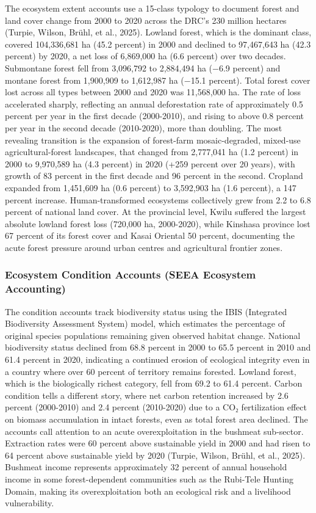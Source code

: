 \documentclass[
  letterpaper,
  DIV=11,
  numbers=noendperiod]{scrartcl}
\begin{document}
The ecosystem extent accounts use a 15-class typology to document forest
and land cover change from 2000 to 2020 across the DRC's 230 million
hectares (Turpie, Wilson, Brühl, et al., 2025). Lowland forest, which is
the dominant class, covered 104,336,681 ha (45.2 percent) in 2000 and
declined to 97,467,643 ha (42.3 percent) by 2020, a net loss of
6,869,000 ha (6.6 percent) over two decades. Submontane forest fell from
3,096,792 to 2,884,494 ha (−6.9 percent) and montane forest from
1,900,909 to 1,612,987 ha (−15.1 percent). Total forest cover lost
across all types between 2000 and 2020 was 11,568,000 ha. The rate of
loss accelerated sharply, reflecting an annual deforestation rate of
approximately 0.5 percent per year in the first decade (2000-2010), and
rising to above 0.8 percent per year in the second decade (2010-2020),
more than doubling. The most revealing transition is the expansion of
forest-farm mosaic-degraded, mixed-use agricultural-forest landscapes,
that changed from 2,777,041 ha (1.2 percent) in 2000 to 9,970,589 ha
(4.3 percent) in 2020 (+259 percent over 20 years), with growth of 83
percent in the first decade and 96 percent in the second. Cropland
expanded from 1,451,609 ha (0.6 percent) to 3,592,903 ha (1.6 percent),
a 147 percent increase. Human-transformed ecosystems collectively grew
from 2.2 to 6.8 percent of national land cover. At the provincial level,
Kwilu suffered the largest absolute lowland forest loss (720,000 ha,
2000-2020), while Kinshasa province lost 67 percent of its forest cover
and Kasai Oriental 50 percent, documenting the acute forest pressure
around urban centres and agricultural frontier zones.

\subsubsection{Ecosystem Condition Accounts (SEEA Ecosystem
Accounting)}\label{ecosystem-condition-accounts-seea-ecosystem-accounting}

The condition accounts track biodiversity status using the IBIS
(Integrated Biodiversity Assessment System) model, which estimates the
percentage of original species populations remaining given observed
habitat change. National biodiversity status declined from 68.8 percent
in 2000 to 65.5 percent in 2010 and 61.4 percent in 2020, indicating a
continued erosion of ecological integrity even in a country where over
60 percent of territory remains forested. Lowland forest, which is the
biologically richest category, fell from 69.2 to 61.4 percent. Carbon
condition tells a different story, where net carbon retention increased
by 2.6 percent (2000-2010) and 2.4 percent (2010-2020) due to a CO₂
fertilization effect on biomass accumulation in intact forests, even as
total forest area declined. The accounts call attention to an acute
overexploitation in the bushmeat sub-sector. Extraction rates were 60
percent above sustainable yield in 2000 and had risen to 64 percent
above sustainable yield by 2020 (Turpie, Wilson, Brühl, et al., 2025).
Bushmeat income represents approximately 32 percent of annual household
income in some forest-dependent communities such as the Rubi-Tele
Hunting Domain, making its overexploitation both an ecological risk and
a livelihood vulnerability.
\end{document}
